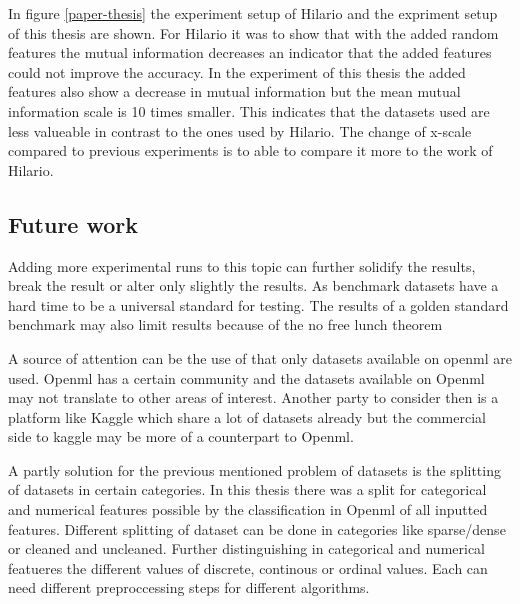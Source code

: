 \documentclass[a4paper,10pt]{article}
\begin{document}
In figure \ref{paper-thesis} the experiment setup of Hilario and the expriment setup of this thesis are shown\cite{Resil-1}. For Hilario it was to show that with the added random features the mutual information decreases an indicator that the added features could not improve the accuracy. In the experiment of this thesis the added features also show a decrease in mutual information but the mean mutual information scale is 10 times smaller. This indicates that the datasets used are less valueable in contrast to the ones used by Hilario. The change of x-scale compared to previous experiments is to able to compare it more to the work of Hilario.






\subsection{Future work}
Adding more experimental runs to this topic can further solidify the results, break the result or alter only slightly the results. As benchmark datasets have a hard time to be a universal standard for testing. The results of a golden standard benchmark may also limit results because of the no free lunch theorem

A source of attention can be the use of that only datasets available on openml are used. Openml has a certain community and the datasets available on Openml may not translate to other areas of interest. Another party to consider then is a platform like Kaggle which share a lot of datasets already but the commercial side to kaggle may be more of a counterpart to Openml. 

A partly solution for the previous mentioned problem of datasets is the splitting of datasets in certain categories. In this thesis there was a split for categorical and numerical features possible by the classification in Openml of all inputted features. Different splitting of dataset can be done in categories like sparse/dense or cleaned and uncleaned. Further distinguishing in categorical and numerical featueres the different values of discrete, continous or ordinal values. Each can need different preproccessing steps for different algorithms. 
\end{document}
